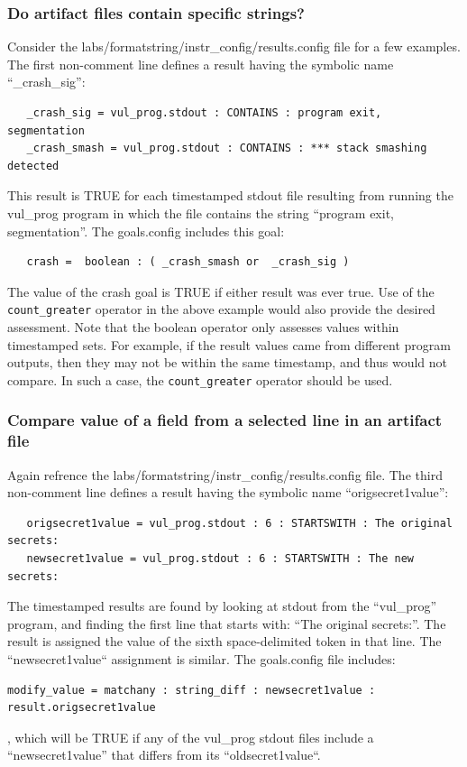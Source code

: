 \documentclass[12pt]{article}
\begin{document}
\subsubsection{Do artifact files contain specific strings?}
Consider the labs/formatstring/instr\_config/results.config file for a few examples.  
The first non-comment line defines a result having the symbolic name ``\_crash\_sig'':
\begin{verbatim}
   _crash_sig = vul_prog.stdout : CONTAINS : program exit, segmentation
   _crash_smash = vul_prog.stdout : CONTAINS : *** stack smashing detected
\end{verbatim}
\noindent This result is TRUE for each timestamped stdout file resulting from running 
the vul\_prog program in which the file contains the string ``program exit, segmentation''.
The goals.config includes this goal:
\begin{verbatim}
   crash =  boolean : ( _crash_smash or  _crash_sig )
\end{verbatim}
\noindent The value of the crash goal is TRUE if either result was ever true.
Use of the {\tt count\_greater} operator in the above example would also provide
the desired assessment.  Note that the boolean operator only assesses values within
timestamped sets. For example, if the result values came from different program
outputs, then they may not be within the same timestamp, and thus would not compare.
In such a case, the {\tt count\_greater} operator should be used. 

\subsubsection{Compare value of a field from a selected line in an artifact file}
Again refrence the labs/formatstring/instr\_config/results.config file.  The third non-comment line
defines a result having the symbolic name ``origsecret1value'':  
\begin{verbatim}
   origsecret1value = vul_prog.stdout : 6 : STARTSWITH : The original secrets:
   newsecret1value = vul_prog.stdout : 6 : STARTSWITH : The new secrets:
\end{verbatim}
\noindent The timestamped results are
found by looking at stdout from the ``vul\_prog'' program, and finding the first line that starts with:
``The original secrets:''.  The result is assigned the value of the sixth space-delimited 
token in that line.  The ``newsecret1value`` assignment is similar.  The goals.config file includes:
\begin{verbatim}
modify_value = matchany : string_diff : newsecret1value : result.origsecret1value
\end{verbatim}
\noindent , which will be TRUE if any of the vul\_prog stdout files include a
``newsecret1value'' that differs from its ``oldsecret1value``.
\end{document}
